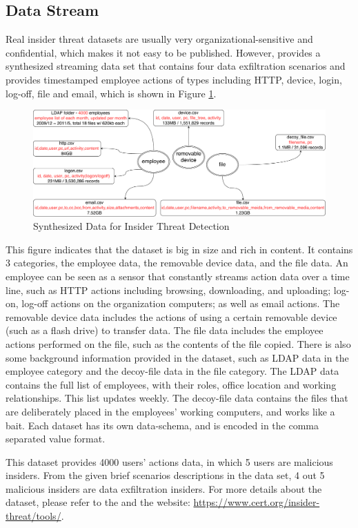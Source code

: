 \subsection{Data Stream}
Real insider threat datasets are usually very organizational-sensitive and confidential, which makes it not easy to be published. 
However, \cite{glasser2013bridging} provides a synthesized streaming data set that contains four data exfiltration scenarios and provides timestamped employee actions of types including HTTP, device, login, log-off, file and email, which is shown in Figure \ref{fig:dxd}.

\begin{figure}[!htbp]
	\centering
    \includegraphics[width=5in]{img/5-dxd.pdf}
    \caption{Synthesized Data for Insider Threat Detection}
    \label{fig:dxd}
\end{figure}

This figure indicates that the dataset is big in size and rich in content. 
It contains 3 categories, the employee data, the removable device data, and the file data. 
An employee can be seen as a sensor that constantly streams action data over a time line, such as HTTP actions including browsing, downloading, and uploading; 
log-on, log-off actions on the organization computers; as well as email actions.
The removable device data includes the actions of using a certain removable device (such as a flash drive) to transfer data.
The file data includes the employee actions performed on the file, such as the contents of the file copied.
There is also some background information provided in the dataset, such as LDAP data in the employee category and the decoy-file data in the file category. 
The LDAP data contains the full list of employees, with their roles, office location and working relationships. 
This list updates weekly. 
The decoy-file data contains the files that are deliberately placed in the employees' working computers, and works like a bait. 
Each dataset has its own data-schema, and is encoded in the comma separated value format.

This dataset provides 4000 users' actions data, in which 5 users are malicious insiders. 
From the given brief scenarios descriptions in the data set, 4 out 5 malicious insiders are data exfiltration insiders. 
For more details about the dataset, please refer to the \cite{glasser2013bridging} and the website: \url{https://www.cert.org/insider-threat/tools/}.
%
